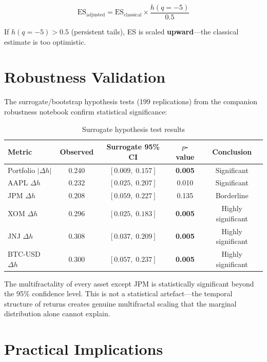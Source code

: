 \documentclass[11pt,a4paper]{article}
\begin{document}
\[
\text{ES}_{\text{adjusted}} = \text{ES}_{\text{classical}} \times \frac{h(q = -5)}{0.5}
\]

If $h(q = -5) > 0.5$ (persistent tails), ES is scaled \textbf{upward}---the classical estimate is too optimistic.

\section{Robustness Validation}

The surrogate/bootstrap hypothesis tests (199 replications) from the companion robustness notebook confirm statistical significance:

\begin{table}[H]
\centering
\caption{Surrogate hypothesis test results}
\begin{tabular}{lcccc}
\toprule
\textbf{Metric} & \textbf{Observed} & \textbf{Surrogate 95\% CI} & \textbf{$p$-value} & \textbf{Conclusion} \\
\midrule
Portfolio $|\Delta h|$ & 0.240 & $[0.009,\; 0.157]$ & \textbf{0.005} & Significant \\
AAPL $\Delta h$        & 0.232 & $[0.025,\; 0.207]$ & 0.010 & Significant \\
JPM $\Delta h$         & 0.208 & $[0.059,\; 0.227]$ & 0.135 & Borderline \\
XOM $\Delta h$         & 0.296 & $[0.025,\; 0.183]$ & \textbf{0.005} & Highly significant \\
JNJ $\Delta h$         & 0.308 & $[0.037,\; 0.209]$ & \textbf{0.005} & Highly significant \\
BTC-USD $\Delta h$     & 0.300 & $[0.057,\; 0.237]$ & \textbf{0.005} & Highly significant \\
\bottomrule
\end{tabular}
\end{table}

\begin{importantbox}
The multifractality of every asset except JPM is statistically significant beyond the 95\% confidence level. This is not a statistical artefact---the temporal structure of returns creates genuine multifractal scaling that the marginal distribution alone cannot explain.
\end{importantbox}

\section{Practical Implications}
\end{document}
